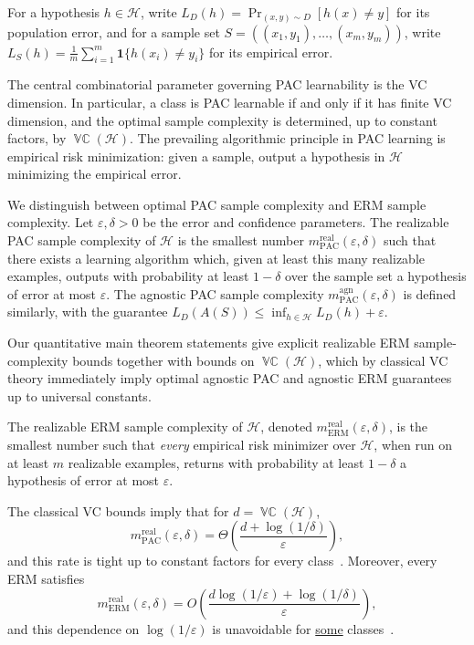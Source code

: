 \documentclass[11pt]{article}
\theoremstyle{plain}
\theoremstyle{definition}
\theoremstyle{remark}
\DeclareMathOperator{\VCdim}{\mathbb{VC}}
\begin{document}
For a hypothesis $h\in\mathcal H$, write
\(
L_D(h)=\Pr_{(x,y)\sim D}[h(x)\neq y]
\)
for its population error, and for a sample set
$S=((x_1,y_1),\ldots,(x_m,y_m))$, write
\(
L_S(h)=\frac1m\sum_{i=1}^m \mathbf 1\{h(x_i)\neq y_i\}
\)
for its empirical error.

The central combinatorial parameter governing PAC learnability is the VC
dimension. In particular, a class is PAC learnable if and only if it has
finite VC dimension, and the optimal sample complexity is determined, up to
constant factors, by $\VCdim(\mathcal H)$. The prevailing algorithmic
principle in PAC learning is empirical risk minimization: given a sample,
output a hypothesis in $\mathcal H$ minimizing the empirical error.

We distinguish between optimal PAC sample complexity and ERM sample
complexity. Let $\varepsilon,\delta>0$ be the error and confidence parameters. 
The realizable PAC sample complexity of $\mathcal H$ is the
smallest number $m_{\mathrm{PAC}}^{\mathrm{real}}(\varepsilon,\delta)$
such that there exists a learning algorithm which, given at least this many
realizable examples, outputs with probability at least $1-\delta$ over the sample set a
hypothesis of error at most $\varepsilon$. The agnostic PAC sample
complexity $m_{\mathrm{PAC}}^{\mathrm{agn}}(\varepsilon,\delta)$ is defined
similarly, with the guarantee \(L_D(A(S))\le \inf_{h\in\mathcal H}L_D(h)+\varepsilon.\)

Our quantitative main theorem statements give explicit realizable ERM sample-complexity bounds together with bounds on \(\VCdim(\mathcal H)\), which by classical VC theory immediately imply optimal agnostic PAC and agnostic ERM guarantees up to universal constants.

The realizable ERM sample complexity of $\mathcal H$, denoted
$m_{\mathrm{ERM}}^{\mathrm{real}}(\varepsilon,\delta)$, is the smallest
number such that \emph{every} empirical risk minimizer over $\mathcal H$, when
run on at least $m$ realizable examples, returns with probability at least
$1-\delta$ a hypothesis of error at most $\varepsilon$.

The classical VC bounds imply that for $d=\VCdim(\mathcal H)$,
\[
m_{\mathrm{PAC}}^{\mathrm{real}}(\varepsilon,\delta)
=
\Theta\left(
\frac{d+\log(1/\delta)}{\varepsilon}
\right),
\]
and this rate is tight up to constant factors for every class~\cite{vapnik:74,blumer1989learnability,hanneke2016optimal}.
Moreover, every ERM satisfies
\[
m_{\mathrm{ERM}}^{\mathrm{real}}(\varepsilon,\delta)
=
O\left(
\frac{d\log(1/\varepsilon)+\log(1/\delta)}{\varepsilon}
\right),
\]
and this dependence on $\log(1/\varepsilon)$ is unavoidable for \underline{some}
classes~\cite{vapnik:74,Hanneke16a,BousquetHMZ20}.
\end{document}
